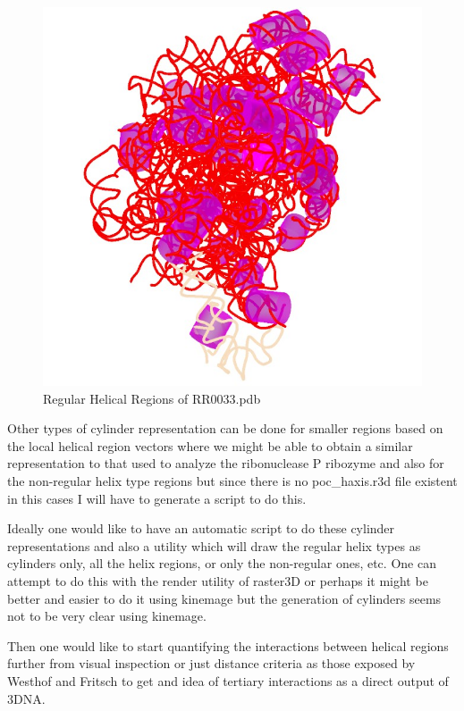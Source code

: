 \begin{figure}[hb]
\centering
\includegraphics[scale=0.45]{cylinder.png}
\caption{Regular Helical Regions of RR0033.pdb}
\end{figure}

Other types of cylinder representation can be done for smaller regions
based on  the local helical region  vectors where we might  be able to
obtain  a   similar  representation  to  that  used   to  analyze  the
ribonuclease P ribozyme\cite{harris1997}  and also for the non-regular
helix type regions but since  there is no poc\_haxis.r3d file existent
in this cases I will have to generate a script to do this.

Ideally  one  would like  to  have an  automatic  script  to do  these
cylinder  representations  and also  a  utility  which  will draw  the
regular helix types as cylinders  only, all the helix regions, or only
the non-regular ones, etc.  One can attempt to do this with the render
utility of raster3D or perhaps it  might be better and easier to do it
using kinemage  but the generation of  cylinders seems not  to be very
clear using kinemage.

Then  one would  like to  start quantifying  the  interactions between
helical  regions  further  from  visual inspection  or  just  distance
criteria as  those exposed by Westhof  and Fritsch \cite{westhof2000}
to get and idea of tertiary interactions as a direct output of 3DNA.


